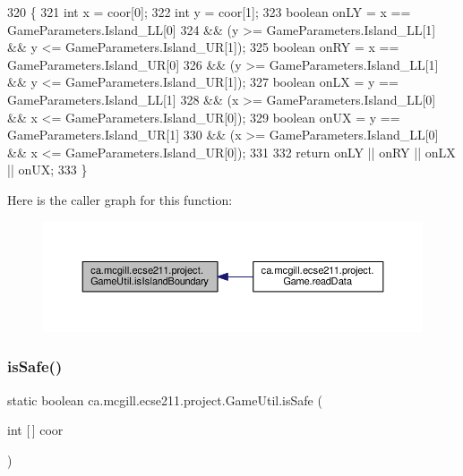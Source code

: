 \begin{DoxyCode}
320                                                      \{
321     \textcolor{keywordtype}{int} x = coor[0];
322     \textcolor{keywordtype}{int} y = coor[1];
323     \textcolor{keywordtype}{boolean} onLY = x == GameParameters.Island\_LL[0]
324         && (y >= GameParameters.Island\_LL[1] && y <= GameParameters.Island\_UR[1]);
325     \textcolor{keywordtype}{boolean} onRY = x == GameParameters.Island\_UR[0]
326         && (y >= GameParameters.Island\_LL[1] && y <= GameParameters.Island\_UR[1]);
327     \textcolor{keywordtype}{boolean} onLX = y == GameParameters.Island\_LL[1]
328         && (x >= GameParameters.Island\_LL[0] && x <= GameParameters.Island\_UR[0]);
329     \textcolor{keywordtype}{boolean} onUX = y == GameParameters.Island\_UR[1]
330         && (x >= GameParameters.Island\_LL[0] && x <= GameParameters.Island\_UR[0]);
331 
332     \textcolor{keywordflow}{return} onLY || onRY || onLX || onUX;
333   \}
\end{DoxyCode}
Here is the caller graph for this function\+:\nopagebreak
\begin{figure}[H]
\begin{center}
\leavevmode
\includegraphics[width=350pt]{classca_1_1mcgill_1_1ecse211_1_1project_1_1_game_util_a5783c3415e13b66362a647504b63741a_icgraph}
\end{center}
\end{figure}
\mbox{\label{classca_1_1mcgill_1_1ecse211_1_1project_1_1_game_util_a4b657445545fb1a814b6699724d72042}} 
\subsubsection{\texorpdfstring{is\+Safe()}{isSafe()}}
{\footnotesize\ttfamily static boolean ca.\+mcgill.\+ecse211.\+project.\+Game\+Util.\+is\+Safe (\begin{DoxyParamCaption}\item[{int \mbox{[}$\,$\mbox{]}}]{coor }\end{DoxyParamCaption})\hspace{0.3cm}{\ttfamily [static]}}

